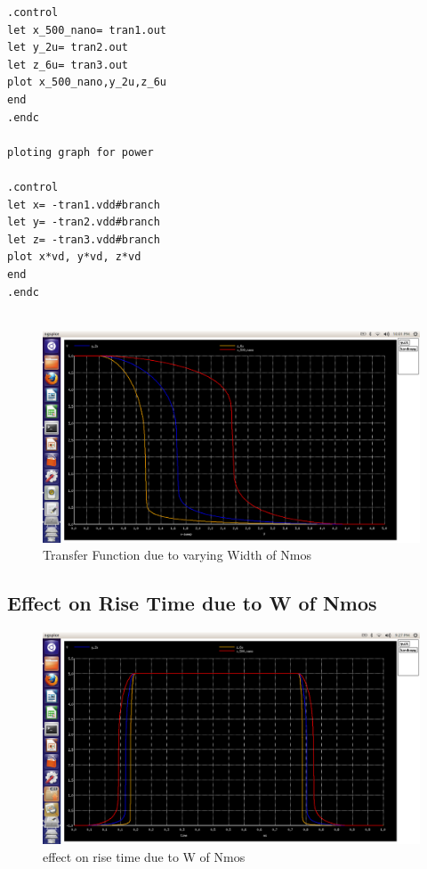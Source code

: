 \documentclass[12pt,a4paper]{article}
\begin{document}
\begin{center}
\begin{lstlisting}
.control
let x_500_nano= tran1.out
let y_2u= tran2.out
let z_6u= tran3.out
plot x_500_nano,y_2u,z_6u
end
.endc

ploting graph for power

.control
let x= -tran1.vdd#branch
let y= -tran2.vdd#branch
let z= -tran3.vdd#branch
plot x*vd, y*vd, z*vd
end
.endc


\end{lstlisting}
 
 \begin{figure}[!ht]
 \centering
 \includegraphics[scale=0.3]{lab5_2_pic1_transfer_fun_dueto_varing_Wof_drivernmos.png}
 \caption[Short]{Transfer Function due to varying Width of Nmos}
 \end{figure}
  \clearpage
  
  
 \subsection{Effect on Rise Time due to W of Nmos}
 \begin{figure}[!ht]
 \centering
 \includegraphics[scale=0.37]{lab5_2_pic4.png}
 \caption[Short]{effect on rise time due to W of Nmos}
 \end{figure}
 

\end{center}
\end{document}
